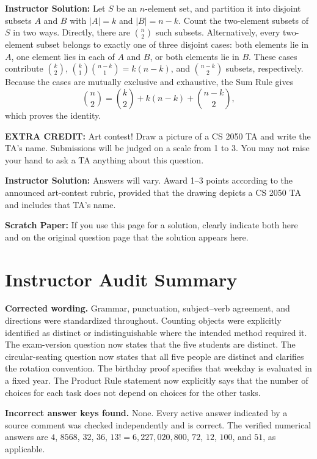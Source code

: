 \documentclass[11pt,addpoints]{exam}
\renewenvironment{solution}
{\par\medskip\noindent\hrulefill\par\smallskip\noindent\textbf{Instructor Solution:}\enspace\ignorespaces}
{\par\smallskip\noindent\hrulefill\par\medskip}
\begin{document}
\begin{questions}
\begin{solution}
Let $S$ be an $n$-element set, and partition it into disjoint subsets $A$ and $B$ with $|A|=k$ and $|B|=n-k$. Count the two-element subsets of $S$ in two ways. Directly, there are $\binom{n}{2}$ such subsets. Alternatively, every two-element subset belongs to exactly one of three disjoint cases: both elements lie in $A$, one element lies in each of $A$ and $B$, or both elements lie in $B$. These cases contribute $\binom{k}{2}$, $\binom{k}{1}\binom{n-k}{1}=k(n-k)$, and $\binom{n-k}{2}$ subsets, respectively. Because the cases are mutually exclusive and exhaustive, the Sum Rule gives
\[
\binom{n}{2}=\binom{k}{2}+k(n-k)+\binom{n-k}{2},
\]
which proves the identity.
\end{solution}

\newpage
\question \textbf{EXTRA CREDIT:} Art contest! Draw a picture of a CS 2050 TA and write the TA's name. Submissions will be judged on a scale from 1 to 3. You may not raise your hand to ask a TA anything about this question.

\begin{solution}
Answers will vary. Award 1--3 points according to the announced art-contest rubric, provided that the drawing depicts a CS 2050 TA and includes that TA's name.
\end{solution}

\newpage
\textbf{Scratch Paper:} If you use this page for a solution, clearly indicate both here and on the original question page that the solution appears here.

\newpage
\section*{Instructor Audit Summary}

\textbf{Corrected wording.} Grammar, punctuation, subject--verb agreement, and directions were standardized throughout. Counting objects were explicitly identified as distinct or indistinguishable where the intended method required it. The exam-version question now states that the five students are distinct. The circular-seating question now states that all five people are distinct and clarifies the rotation convention. The birthday proof specifies that weekday is evaluated in a fixed year. The Product Rule statement now explicitly says that the number of choices for each task does not depend on choices for the other tasks.

\textbf{Incorrect answer keys found.} None. Every active answer indicated by a source comment was checked independently and is correct. The verified numerical answers are $4$, $8568$, $32$, $36$, $13!=6{,}227{,}020{,}800$, $72$, $12$, $100$, and $51$, as applicable.


\end{questions}
\end{document}
